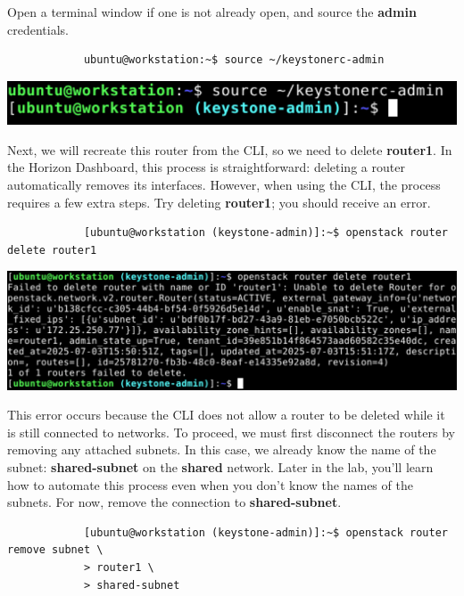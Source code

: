\documentclass[letterpaper, 12pt]{article}
\begin{document}
\begin{enumerate}
    \begin{labstep}
        Open a terminal window if one is not already open, and source the \textbf{admin} credentials.
        \begin{lstlisting}
            ubuntu@workstation:~$ source ~/keystonerc-admin
        \end{lstlisting}

        \begin{center}
            \includegraphics[width=\linewidth]{images/part2/step8.png}
        \end{center}
    \end{labstep}

    \begin{labstep}
        Next, we will recreate this router from the CLI, so we need to delete \textbf{router1}.
        In the Horizon Dashboard, this process is straightforward: deleting a router automatically removes its interfaces.
        However, when using the CLI, the process requires a few extra steps.
        Try deleting \textbf{router1}; you should receive an error.
        \begin{lstlisting}
            [ubuntu@workstation (keystone-admin)]:~$ openstack router delete router1
        \end{lstlisting}

        \begin{center}
            \includegraphics[width=\linewidth]{images/part2/step9.png}
        \end{center}
    \end{labstep}

    \begin{labstep}
        This error occurs because the CLI does not allow a router to be deleted while it is still connected to networks.
        To proceed, we must first disconnect the routers by removing any attached subnets.
        In this case, we already know the name of the subnet: \textbf{shared-subnet} on the \textbf{shared} network.
        Later in the lab, you'll learn how to automate this process even when you don't know the names of the subnets.
        For now, remove the connection to \textbf{shared-subnet}.
        \begin{lstlisting}
            [ubuntu@workstation (keystone-admin)]:~$ openstack router remove subnet \
            > router1 \
            > shared-subnet
        \end{lstlisting}


\end{labstep}
\end{enumerate}
\end{document}
